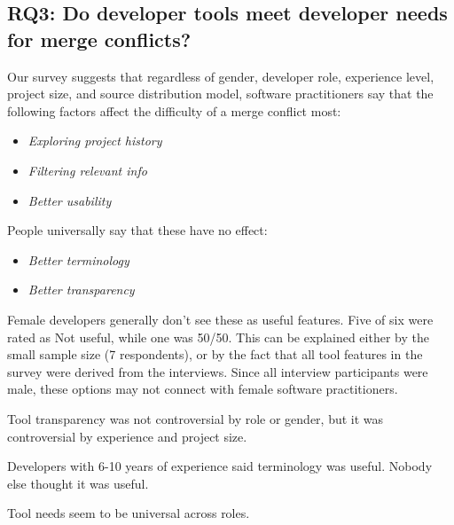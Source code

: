 \subsection{RQ3: Do developer tools meet developer needs for merge conflicts?}


Our survey suggests that regardless of gender, developer role, experience level, project size, and source distribution model, software practitioners say that the following factors affect the difficulty of a merge conflict most:

\begin{itemize}
	\item \textit{Exploring project history}\\
	\item \textit{Filtering relevant info}\\
	\item \textit{Better usability}\\
\end{itemize}

People universally say that these have no effect:
\begin{itemize}
	\item \textit{Better terminology}\\
	\item \textit{Better transparency}\\
\end{itemize}

Female developers generally don’t see these as useful features. Five of six were rated as Not useful, while one was 50/50. This can be explained either by the small sample size (7 respondents), or by the fact that all tool features in the survey were derived from the interviews. Since all interview participants were male, these options may not connect with female software practitioners.

Tool transparency was not controversial by role or gender, but it was controversial by experience and project size.

Developers with 6-10 years of experience said terminology was useful. Nobody else thought it was useful.

Tool needs seem to be universal across roles. 


%
%
%
%
